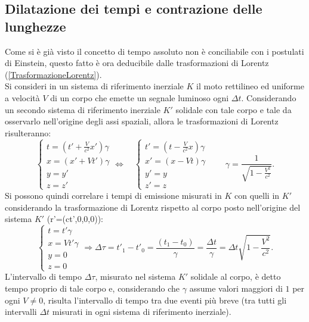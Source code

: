 \subsection{Dilatazione dei tempi e contrazione delle lunghezze}\label{sec:ContrazioneDilatazione}
Come si è già visto il concetto di tempo assoluto non è conciliabile con i postulati di Einstein, questo fatto è ora deducibile dalle trasformazioni di Lorentz (\ref{TrasformazioneLorentz}).\\
Si consideri in un sistema di riferimento inerziale $K$ il moto rettilineo ed uniforme a velocità $V$ di un corpo che emette un segnale luminoso ogni $\Delta t$. Considerando un secondo sistema di riferimento inerziale $K'$ solidale con tale corpo e tale da osservarlo nell'origine degli assi spaziali, allora le trasformazioni di Lorentz risulteranno:
\begin{equation*}
    \begin{cases}
        t=(t'+\frac{V}{c^2}x')\gamma\\
        x=(x'+Vt')\gamma\\
        y=y'\\
        z=z'
    \end{cases}
    \Longleftrightarrow \quad
    \begin{cases}
        t'=(t-\frac{V}{c^2}x)\gamma\\
        x'=(x-Vt)\gamma\\
        y'=y\\
        z'=z
    \end{cases}
    \qquad \gamma=\frac{1}{\sqrt{1-\frac{V^2}{c^2}}}.
\end{equation*}
Si possono quindi correlare i tempi di emissione misurati in $K$ con quelli in $K'$ considerando la trasformazione di Lorentz rispetto al corpo posto nell'origine del sistema $K'$ (r'=(ct',0,0,0)): 
\begin{equation}
    \begin{cases}
        t=t'\gamma\\
        x=Vt'\gamma\\
        y=0\\
        z=0
    \end{cases}
    \Rightarrow \Delta \tau=t'_1-t'_0=\frac{(t_1-t_0)}{\gamma}=\frac{\Delta t}{\gamma}=\Delta t \sqrt{1-\frac{V^2}{c^2}}.
    \label{dilatazioneTempi}
\end{equation}
L'intervallo di tempo $\Delta \tau$, misurato nel sistema $K'$ solidale al corpo, è detto tempo proprio di tale corpo e, considerando che $\gamma$ assume valori maggiori di $1$ per ogni $V\neq 0$, risulta l'intervallo di tempo tra due eventi più breve (tra tutti gli intervalli $\Delta t$ misurati in ogni sistema di riferimento inerziale).\\


